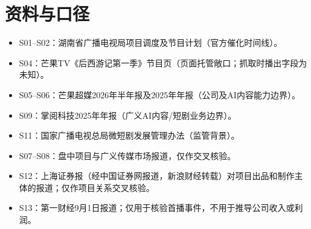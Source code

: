 \section*{资料与口径}
\begin{itemize}
  \item S01--S02：湖南省广播电视局项目调度及节目计划（官方催化时间线）。
  \item S04：芒果TV《后西游记第一季》节目页（页面托管敞口；抓取时播出字段为未知）。
  \item S05--S06：芒果超媒2026年半年报及2025年年报（公司及AI内容能力边界）。
  \item S09：掌阅科技2025年年报（广义AI内容/短剧业务边界）。
  \item S11：国家广播电视总局微短剧发展管理办法（监管背景）。
  \item S07--S08：盘中项目与广义传媒市场报道，仅作交叉核验。
  \item S12：上海证券报\textcolor{steelgrey}{（经中国证券网报道，新浪财经转载）}对项目出品和制作主体的报道；仅作项目关系交叉核验。
  \item S13：第一财经9月1日报道；仅用于核验首播事件，不用于推导公司收入或利润。
\end{itemize}

